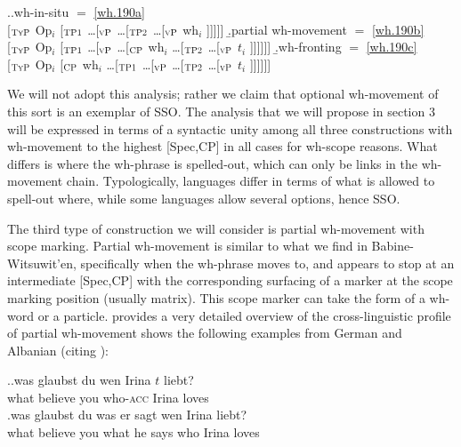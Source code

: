 \documentclass[11pt]{article}
\begin{document}
\ex.\a.\label{wh.240a}wh-in-situ $=$ \ref{wh.190a}\\{}[$_{\textsc{TyP}}$ Op$_i$ [$_{\textsc{TP1}}$ \dots [$_{\textsc{vP}}$ \dots [$_{\textsc{TP2}}$ \dots [$_{\textsc{vP}}$ wh$_i$ ]]]]]\hspace{\fill}
   \b.\label{wh.240b}partial wh-movement $=$ \ref{wh.190b}\\{}[$_{\textsc{TyP}}$ Op$_i$ [$_{\textsc{TP1}}$ \dots [$_{\textsc{vP}}$ \dots [$_{\textsc{CP}}$ wh$_i$ \dots [$_{\textsc{TP2}}$ \dots [$_{\textsc{vP}}$ $t_i$ ]]]]]]\hspace{\fill}
   \b.\label{wh.240c}wh-fronting $=$ \ref{wh.190c}\\{}[$_{\textsc{TyP}}$ Op$_i$ [$_{\textsc{CP}}$ wh$_i$ \dots [$_{\textsc{TP1}}$ \dots [$_{\textsc{vP}}$ \dots [$_{\textsc{TP2}}$ \dots [$_{\textsc{vP}}$ $t_i$ ]]]]]]\hspace{\fill}\hspace{\fill}

We will not adopt this analysis; rather we claim that optional wh-movement of this sort is an exemplar of SSO. The analysis that we will propose in section 3 will be expressed in terms of a syntactic unity among all three constructions with wh-movement to the highest [Spec,CP] in all cases for wh-scope reasons. What differs is where the wh-phrase is spelled-out, which can only be links in the wh-movement chain. Typologically, languages differ in terms of what is allowed to spell-out where, while some languages allow several options, hence SSO.

The third type of construction we will consider is partial wh-movement with scope marking. Partial wh-movement is similar to what we find in Babine-Witsuwit'en, specifically when the wh-phrase moves to, and appears to stop at an intermediate [Spec,CP] with the corresponding surfacing of a marker at the scope marking position (usually matrix). This scope marker can take the form of a wh-word or a particle. \cite{fanselow:2006} provides a very detailed overview of the cross-linguistic profile of partial wh-movement shows the following examples from German and Albanian (citing \citealp{turano:1995}):

\ex.\label{wh.250}\ag.\label{wh.250a}was glaubst du wen Irina $t$ liebt?\\
   what believe you who-\textsc{acc} Irina {} loves\\
   \bg.\label{wh.250b}was glaubst du was er sagt wen Irina liebt?\\
   what believe you what he says who Irina loves\\
\end{document}
